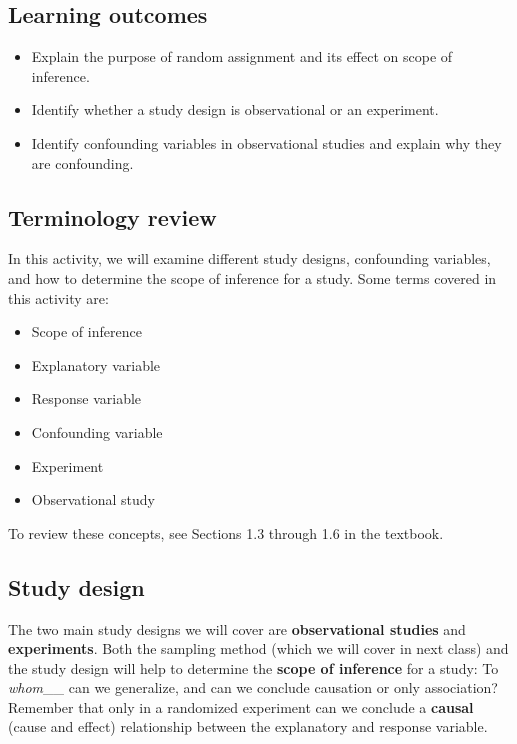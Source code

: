 \documentclass[
]{report}
\begin{document}

\hypertarget{learning-outcomes-1}{%
\subsection{Learning outcomes}\label{learning-outcomes-1}}

\begin{itemize}
\item
  Explain the purpose of random assignment and its effect on scope of inference.
\item
  Identify whether a study design is observational or an experiment.
\item
  Identify confounding variables in observational studies and explain why they are confounding.
\end{itemize}

\hypertarget{terminology-review-1}{%
\subsection{Terminology review}\label{terminology-review-1}}

In this activity, we will examine different study designs, confounding variables, and how to determine the scope of inference for a study. Some terms covered in this activity are:

\begin{itemize}
\item
  Scope of inference
\item
  Explanatory variable
\item
  Response variable
\item
  Confounding variable
\item
  Experiment
\item
  Observational study
\end{itemize}

To review these concepts, see Sections 1.3 through 1.6 in the textbook.

\hypertarget{study-design-1}{%
\subsection{Study design}\label{study-design-1}}

The two main study designs we will cover are \textbf{observational studies} and \textbf{experiments}. Both the sampling method (which we will cover in next class) and the study design will help to determine the \textbf{scope of inference} for a study: To \emph{whom}\_\_ can we generalize, and can we conclude causation or only association? Remember that only in a randomized experiment can we conclude a \textbf{causal} (cause and effect) relationship between the explanatory and response variable.
\end{document}
